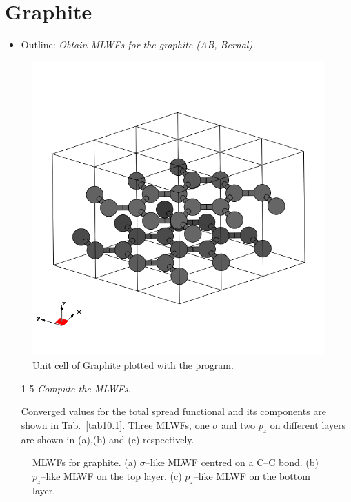 \section{Graphite}
\label{sec10:graphite}

\begin{itemize}
\item Outline: {\it Obtain MLWFs for the graphite (AB, Bernal).}
\end{itemize}

\begin{figure}[h!]
\centering
\includegraphics[width=0.25\columnwidth,trim={20pt 55pt 35pt 55pt},clip]{figure/example10/graphite.png}
\caption{Unit cell of Graphite plotted with the \xcrysden{} program.}
\label{fig10.0}
\end{figure}

\begin{itemize}
	\item[1-5] {\it Compute the MLWFs.}

	Converged values for the total spread functional and its components are shown in Tab.~\ref{tab10.1}.
	Three MLWFs, one $\sigma$ and two $p_z$ on different layers are shown in (a),(b) and (c) respectively.
\end{itemize}

\begin{figure}[h!]
\centering
{}
\centering
{}
\centering
{}
\caption{MLWFs for graphite. (a) $\sigma$--like MLWF centred on a C--C bond. (b) $p_z$--like MLWF on the top layer. (c) $p_z$--like MLWF on the bottom layer.}\label{fig10.1}
\end{figure}


